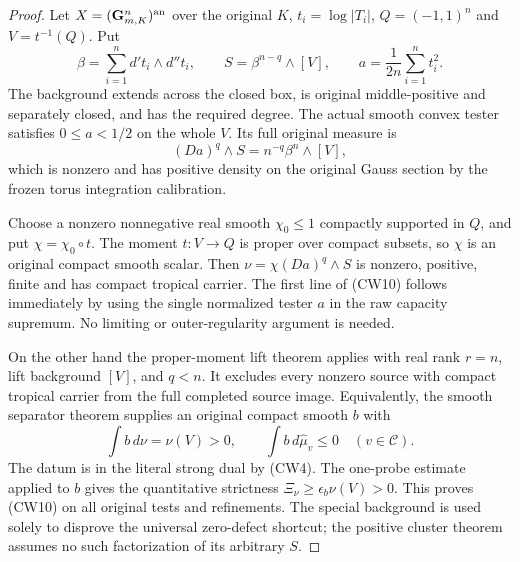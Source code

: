 \begin{proof}
Let $X=(\mathbf G_{m,K}^n)^{\rm an}$ over the original $K$,
$t_i=\log|T_i|$, $Q=(-1,1)^n$ and $V=t^{-1}(Q)$. Put
\[
       \beta=\sum_{i=1}^n d't_i\wedge d''t_i,
       \qquad S=\beta^{n-q}\wedge[V],
       \qquad a=\frac{1}{2n}\sum_{i=1}^n t_i^2.
 \tag{CW11}
\]
The background extends across the closed box, is original
middle-positive and separately closed, and has the required
degree. The actual smooth convex tester satisfies $0\leq a<1/2$
on the whole $V$. Its full original measure is
\[
                      (Da)^q\wedge S=n^{-q}\beta^n\wedge[V],
 \tag{CW12}
\]
which is nonzero and has positive density on the original
Gauss section by the frozen torus integration calibration.

Choose a nonzero nonnegative real smooth $\chi_0\leq1$
compactly supported in $Q$, and put $\chi=\chi_0\circ t$.
The moment $t:V\to Q$ is proper over compact subsets,
so $\chi$ is an original compact smooth scalar.
Then $\nu=\chi(Da)^q\wedge S$ is nonzero, positive,
finite and has compact tropical carrier.
The first line of (CW10) follows immediately by using the
single normalized tester $a$ in the raw capacity supremum.
No limiting or outer-regularity argument is needed.

On the other hand the proper-moment lift theorem applies
with real rank $r=n$, lift background $[V]$, and $q<n$.
It excludes every nonzero source with compact tropical
carrier from the full completed source image. Equivalently,
the smooth separator theorem supplies an original compact
smooth $b$ with
\[
       \int b\,d\nu=\nu(V)>0,\qquad
       \int b\,d\widehat\mu_v\leq0
                                      \quad(v\in\mathscr C).
 \tag{CW13}
\]
The datum is in the literal strong dual by (CW4).
The one-probe estimate applied to $b$ gives the quantitative
strictness $\Xi_\nu\geq\epsilon_b\nu(V)>0$.
This proves (CW10) on all original tests and refinements.
The special background is used solely to disprove the
universal zero-defect shortcut; the positive cluster theorem
assumes no such factorization of its arbitrary $S$.
\end{proof}

